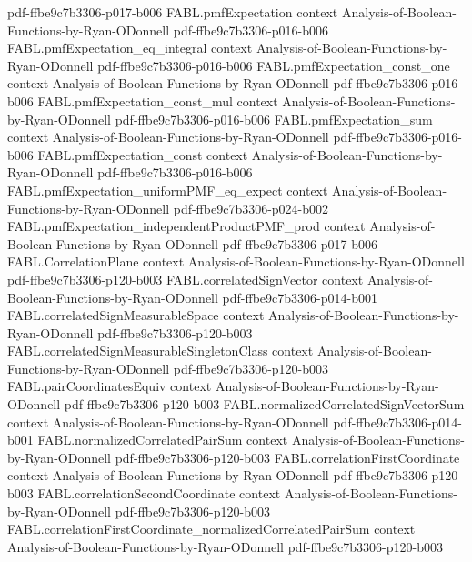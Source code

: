 \begin{theorem}
  {pdf-ffbe9c7b3306-p017-b006}
\proofstep
  {FABL.pmfExpectation}
  {context}
  {Analysis-of-Boolean-Functions-by-Ryan-ODonnell}
  {pdf-ffbe9c7b3306-p016-b006}
\proofstep
  {FABL.pmfExpectation_eq_integral}
  {context}
  {Analysis-of-Boolean-Functions-by-Ryan-ODonnell}
  {pdf-ffbe9c7b3306-p016-b006}
\proofstep
  {FABL.pmfExpectation_const_one}
  {context}
  {Analysis-of-Boolean-Functions-by-Ryan-ODonnell}
  {pdf-ffbe9c7b3306-p016-b006}
\proofstep
  {FABL.pmfExpectation_const_mul}
  {context}
  {Analysis-of-Boolean-Functions-by-Ryan-ODonnell}
  {pdf-ffbe9c7b3306-p016-b006}
\proofstep
  {FABL.pmfExpectation_sum}
  {context}
  {Analysis-of-Boolean-Functions-by-Ryan-ODonnell}
  {pdf-ffbe9c7b3306-p016-b006}
\proofstep
  {FABL.pmfExpectation_const}
  {context}
  {Analysis-of-Boolean-Functions-by-Ryan-ODonnell}
  {pdf-ffbe9c7b3306-p016-b006}
\proofstep
  {FABL.pmfExpectation_uniformPMF_eq_expect}
  {context}
  {Analysis-of-Boolean-Functions-by-Ryan-ODonnell}
  {pdf-ffbe9c7b3306-p024-b002}
\proofstep
  {FABL.pmfExpectation_independentProductPMF_prod}
  {context}
  {Analysis-of-Boolean-Functions-by-Ryan-ODonnell}
  {pdf-ffbe9c7b3306-p017-b006}
\proofstep
  {FABL.CorrelationPlane}
  {context}
  {Analysis-of-Boolean-Functions-by-Ryan-ODonnell}
  {pdf-ffbe9c7b3306-p120-b003}
\proofstep
  {FABL.correlatedSignVector}
  {context}
  {Analysis-of-Boolean-Functions-by-Ryan-ODonnell}
  {pdf-ffbe9c7b3306-p014-b001}
\proofstep
  {FABL.correlatedSignMeasurableSpace}
  {context}
  {Analysis-of-Boolean-Functions-by-Ryan-ODonnell}
  {pdf-ffbe9c7b3306-p120-b003}
\proofstep
  {FABL.correlatedSignMeasurableSingletonClass}
  {context}
  {Analysis-of-Boolean-Functions-by-Ryan-ODonnell}
  {pdf-ffbe9c7b3306-p120-b003}
\proofstep
  {FABL.pairCoordinatesEquiv}
  {context}
  {Analysis-of-Boolean-Functions-by-Ryan-ODonnell}
  {pdf-ffbe9c7b3306-p120-b003}
\proofstep
  {FABL.normalizedCorrelatedSignVectorSum}
  {context}
  {Analysis-of-Boolean-Functions-by-Ryan-ODonnell}
  {pdf-ffbe9c7b3306-p014-b001}
\proofstep
  {FABL.normalizedCorrelatedPairSum}
  {context}
  {Analysis-of-Boolean-Functions-by-Ryan-ODonnell}
  {pdf-ffbe9c7b3306-p120-b003}
\proofstep
  {FABL.correlationFirstCoordinate}
  {context}
  {Analysis-of-Boolean-Functions-by-Ryan-ODonnell}
  {pdf-ffbe9c7b3306-p120-b003}
\proofstep
  {FABL.correlationSecondCoordinate}
  {context}
  {Analysis-of-Boolean-Functions-by-Ryan-ODonnell}
  {pdf-ffbe9c7b3306-p120-b003}
\proofstep
  {FABL.correlationFirstCoordinate_normalizedCorrelatedPairSum}
  {context}
  {Analysis-of-Boolean-Functions-by-Ryan-ODonnell}
  {pdf-ffbe9c7b3306-p120-b003}
\proofstep

\end{theorem}
